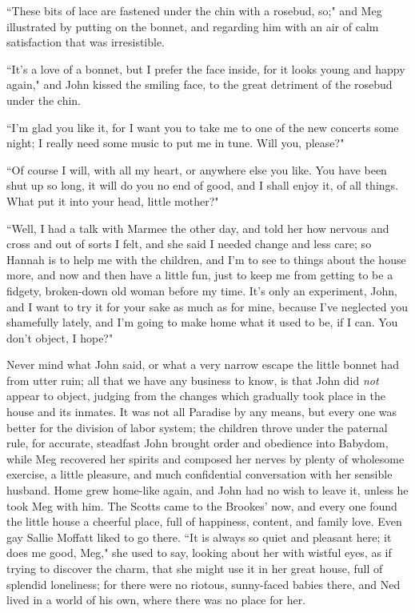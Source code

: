``These bits of lace are fastened under the chin with a rosebud, so;" and
Meg illustrated by putting on the bonnet, and regarding him with an air
of calm satisfaction that was irresistible.

``It's a love of a bonnet, but I prefer the face inside,
for it looks young and happy again," and John kissed the smiling face,
to the great detriment of the rosebud under the chin.

``I'm glad you like it, for I want you to take me to one
of the new concerts some night; I really need some music to put me in
tune. Will you, please?"

``Of course I will, with all my heart, or anywhere else you like. You
have been shut up so long, it will do you no end of good, and I shall
enjoy it, of all things. What put it into your head, little mother?"

``Well, I had a talk with Marmee the other day, and told her how nervous
and cross and out of sorts I felt, and she said I needed change and less
care; so Hannah is to help me with the children, and I'm
to see to things about the house more, and now and then have a little
fun, just to keep me from getting to be a fidgety, broken-down old woman
before my time. It's only an experiment, John, and I
want to try it for your sake as much as for mine, because
I've neglected you shamefully lately, and
I'm going to make home what it used to be, if I can. You
don't object, I hope?"

Never mind what John said, or what a very narrow escape the little
bonnet had from utter ruin; all that we have any business to know, is
that John did \emph{not} appear to object, judging from the changes
which gradually took place in the house and its inmates. It was not all
Paradise by any means, but every one was better for the division of
labor system; the children throve under the paternal rule, for accurate,
steadfast John brought order and obedience into Babydom, while Meg
recovered her spirits and composed her nerves by plenty of wholesome
exercise, a little pleasure, and much confidential conversation with her
sensible husband. Home grew home-like again, and John had no wish to
leave it, unless he took Meg with him. The Scotts came to the
Brookes' now, and every one found the little house a
cheerful place, full of happiness, content, and family love. Even gay
Sallie Moffatt liked to go there. ``It is always so quiet and pleasant
here; it does me good, Meg," she used to say, looking about her with
wistful eyes, as if trying to discover the charm, that she might use it
in her great house, full of splendid loneliness; for there were no
riotous, sunny-faced babies there, and Ned lived in a world of his own,
where there was no place for her.

